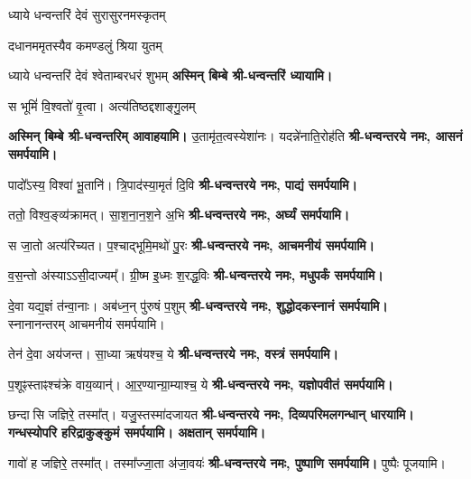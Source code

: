 \renewcommand{\devAya}{श्री-धन्वन्तरये नमः,}
\begin{center}

{ध्याये धन्वन्तरिं देवं सुरासुरनमस्कृतम्}

{दधानममृतस्यैव कमण्डलुं श्रिया युतम्}

{ध्याये धन्वन्तरिं देवं श्वेताम्बरधरं शुभम्}
\textbf{अस्मिन् बिम्बे श्री-धन्वन्तरिं ध्यायामि।}
\medskip

{स भूमिं॑ वि॒श्वतो॑ वृ॒त्वा। अत्य॑तिष्ठद्दशाङ्गु॒लम्}

\textbf{अस्मिन् बिम्बे श्री-धन्वन्तरिम् आवाहयामि।}
\medskip
{}
{उ॒तामृ॑त॒त्वस्येशा॑नः। यदन्ने॑नाति॒रोह॑ति}
\textbf{\devAya{} आसनं समर्पयामि।}\medskip

{पादो᳚ऽस्य॒ विश्वा॑ भू॒तानि॑। त्रि॒पाद॑स्या॒मृतं॑ दि॒वि}
\textbf{\devAya{} पाद्यं समर्पयामि।}\medskip

{ततो॒ विश्व॒ङ्व्य॑क्रामत्। सा॒श॒ना॒न॒श॒ने अ॒भि}
\textbf{\devAya{} अर्घ्यं समर्पयामि।}\medskip

{स जा॒तो अत्य॑रिच्यत। प॒श्चाद्भूमि॒मथो॑ पु॒रः}
\textbf{\devAya{} आचमनीयं समर्पयामि।}\medskip

{व॒स॒न्तो अ॑स्याऽऽसी॒दाज्यम्᳚। ग्री॒ष्म इ॒ध्मः श॒रद्ध॒विः}
\textbf{\devAya{} मधुपर्कं समर्पयामि।}\medskip

{दे॒वा यद्य॒ज्ञं त॑न्वा॒नाः। अब॑ध्न॒न् पु॑रुषं प॒शुम्}
\textbf{\devAya{} शुद्धोदकस्नानं समर्पयामि। }\\
स्नानानन्तरम् आचमनीयं समर्पयामि।\medskip

{तेन॑ दे॒वा अय॑जन्त। सा॒ध्या ऋष॑यश्च॒ ये}
\textbf{\devAya{} वस्त्रं समर्पयामि।}\medskip

{प॒शूꣴस्ताꣴश्च॑क्रे वाय॒व्यान्॑। आ॒र॒ण्यान्ग्रा॒म्याश्च॒ ये}
\textbf{\devAya{} यज्ञोपवीतं समर्पयामि।}\medskip

{छन्दासि जज्ञिरे॒ तस्मा᳚त्। यजु॒स्तस्मा॑दजायत}
\textbf{\devAya{} दिव्यपरिमलगन्धान् धारयामि। \\
गन्धस्योपरि हरिद्राकुङ्कुमं समर्पयामि। अक्षतान् समर्पयामि।}\medskip

{गावो॑ ह जज्ञिरे॒ तस्मा᳚त्। तस्मा᳚ज्जा॒ता अ॑जा॒वयः॑}
\textbf{\devAya{} पुष्पाणि समर्पयामि। } पुष्पैः पूजयामि।
\medskip

\end{center}

